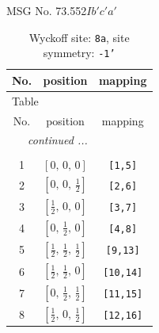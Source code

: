\documentclass[fleqn,8pt]{jsarticle}
\begin{document}
\setcounter{MaxMatrixCols}{32}

\renewcommand{\tablename}{Table~}
\renewcommand{\figurename}{Figure~}
\begin{center}
\LARGE
MSG No. 73.552\quad$Ib'c'a'$
\end{center}
\renewcommand{\arraystretch}{1.2}
\begin{longtable}{ccc}
\caption{Wyckoff site: {\tt 8a}, site symmetry: {\tt -1'}}
 \\
 \hline \hline
No. & position & mapping \\ \hline \endfirsthead

\multicolumn{2}{l}{\tablename\ \thetable{}} \\
 \hline \hline
No. & position & mapping \\ \hline \endhead

 \hline \hline
\multicolumn{2}{r}{\footnotesize\it continued ...} \\ \endfoot

 \hline \hline
\multicolumn{2}{r}{} \\ \endlastfoot

1 & $\left[ 0,\, 0,\, 0 \right]$ & {\tt [1,5]} \\ \hline
2 & $\left[ 0,\, 0,\, \frac{1}{2} \right]$ & {\tt [2,6]} \\ \hline
3 & $\left[ \frac{1}{2},\, 0,\, 0 \right]$ & {\tt [3,7]} \\ \hline
4 & $\left[ 0,\, \frac{1}{2},\, 0 \right]$ & {\tt [4,8]} \\ \hline
5 & $\left[ \frac{1}{2},\, \frac{1}{2},\, \frac{1}{2} \right]$ & {\tt [9,13]} \\ \hline
6 & $\left[ \frac{1}{2},\, \frac{1}{2},\, 0 \right]$ & {\tt [10,14]} \\ \hline
7 & $\left[ 0,\, \frac{1}{2},\, \frac{1}{2} \right]$ & {\tt [11,15]} \\ \hline
8 & $\left[ \frac{1}{2},\, 0,\, \frac{1}{2} \right]$ & {\tt [12,16]} \\
\end{longtable}
\renewcommand{\arraystretch}{1.2}
\end{document}
